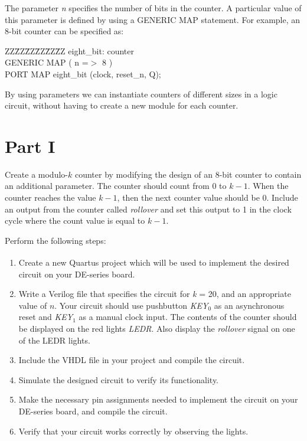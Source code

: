 \documentclass[epsfig,10pt,fullpage]{article}
\begin{document}
The parameter {\it n} specifies the number of bits in the counter. A particular value of 
this parameter is defined by using a GENERIC MAP statement. For example, an 8-bit 
counter can be specified as:

\begin{center}
\begin{minipage}[t]{12.5 cm}
\begin{tabbing}
ZZ\=ZZ\=ZZ\=ZZ\=ZZ\=ZZ\kill
\>eight\_bit: counter\\
\>\>GENERIC MAP ( n =$>$ 8 )\\
\>\>PORT MAP eight\_bit (clock, reset\_n, Q);
\end{tabbing}
\end{minipage}
\end{center}

By using parameters we can instantiate counters of different sizes in a logic circuit, without having to create a new module for each counter.

\section*{Part I}
Create a modulo-$k$ counter by modifying the design of an 8-bit counter to contain an 
additional parameter. The counter should count from $0$ to $k-1$. When the counter reaches 
the value $k-1$, then the next counter value should be $0$. Include an output from the
counter called {\it rollover} and set this output to 1 in the clock cycle where the count value
is equal to $k-1$.

Perform the following steps:
\begin{enumerate}
\item Create a new Quartus\textsuperscript{\textregistered} project which will be used to implement the desired circuit
on your DE-series board.
\item Write a Verilog file that specifies the circuit for {\it k} = 20, and an appropriate
value of $n$.  Your circuit should use pushbutton {\it KEY}$_0$ as an asynchronous reset 
and {\it KEY}$_1$ as a manual clock input. 
The contents of the counter should be displayed on the red lights {\it LEDR}. Also display 
the {\it rollover} signal on one of the LEDR lights.
\item Include the VHDL file in your project and compile the circuit.
\item Simulate the designed circuit to verify its functionality.
\item Make the necessary pin assignments needed to implement the circuit on your
DE-series board, and compile the circuit.
\item Verify that your circuit works correctly by observing the lights.
\end{enumerate}
\end{document}
